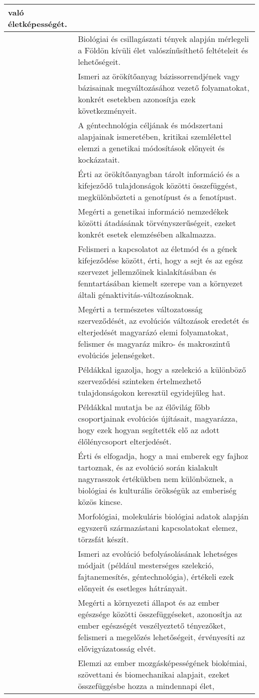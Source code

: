 \begin{longtable}[]{p{\evflength}@{\strut}>{\begin{minipage}{\columnlength}\strut}l<{\strut\end{minipage}}}
  való életképességét.
\tabularnewline
\hline
&
  Biológiai és csillagászati tények alapján mérlegeli a Földön kívüli
  élet valószínűsíthető feltételeit és lehetőségeit.
\tabularnewline
\hline
&
  Ismeri az örökítőanyag bázissorrendjének vagy bázisainak
  megváltozásához vezető folyamatokat, konkrét esetekben azonosítja ezek
  következményeit.
\tabularnewline
\hline
&
  A géntechnológia céljának és módszertani alapjainak ismeretében,
  kritikai szemlélettel elemzi a genetikai módosítások előnyeit és
  kockázatait.
\tabularnewline
\hline
&
  Érti az örökítőanyagban tárolt információ és a kifejeződő
  tulajdonságok közötti összefüggést, megkülönbözteti a genotípust és a
  fenotípust.
\tabularnewline
\hline
&
  Megérti a genetikai információ nemzedékek közötti átadásának
  törvényszerűségeit, ezeket konkrét esetek elemzésében alkalmazza.
\tabularnewline
\hline
&
  Felismeri a kapcsolatot az életmód és a gének kifejeződése között,
  érti, hogy a sejt és az egész szervezet jellemzőinek kialakításában és
  fenntartásában kiemelt szerepe van a környezet általi
  génaktivitás-változásoknak.
\tabularnewline
\hline
&
  Megérti a természetes változatosság szerveződését, az evolúciós
  változások eredetét és elterjedését magyarázó elemi folyamatokat,
  felismer és magyaráz mikro- és makroszintű evolúciós jelenségeket.
\tabularnewline
\hline
&
  Példákkal igazolja, hogy a szelekció a különböző szerveződési
  szinteken értelmezhető tulajdonságokon keresztül egyidejűleg hat.
\tabularnewline
\hline
&
  Példákkal mutatja be az élővilág főbb csoportjainak evolúciós
  újításait, magyarázza, hogy ezek hogyan segítették elő az adott
  élőlénycsoport elterjedését.
\tabularnewline
\hline
&
  Érti és elfogadja, hogy a mai emberek egy fajhoz tartoznak, és az
  evolúció során kialakult nagyrasszok értékükben nem különböznek, a
  biológiai és kulturális örökségük az emberiség közös kincse.
\tabularnewline
\hline
&
  Morfológiai, molekuláris biológiai adatok alapján egyszerű
  származástani kapcsolatokat elemez, törzsfát készít.
\tabularnewline
\hline
&
  Ismeri az evolúció befolyásolásának lehetséges módjait (például
  mesterséges szelekció, fajtanemesítés, géntechnológia), értékeli ezek
  előnyeit és esetleges hátrányait.
\tabularnewline
\hline
&
  Megérti a környezeti állapot és az ember egészsége közötti
  összefüggéseket, azonosítja az ember egészségét veszélyeztető
  tényezőket, felismeri a megelőzés lehetőségeit, érvényesíti az
  elővigyázatosság elvét.
\tabularnewline
\hline
&
  Elemzi az ember mozgásképességének biokémiai, szövettani és
  biomechanikai alapjait, ezeket összefüggésbe hozza a mindennapi élet,

\end{longtable}
